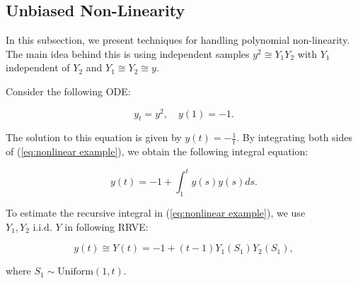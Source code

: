 \documentclass[a4paper,12pt]{article}
\begin{document}
\subsection{Unbiased Non-Linearity}

In this subsection, we present techniques for handling polynomial non-linearity.
The main idea behind this is using independent samples
$y^{2} \cong Y_{1} Y_{2}$ with $Y_{1}$ independent of $ Y_{2}$ and
$Y_{1} \cong Y_{2} \cong y$.


\begin{example}[$y_t=y^{2}$] \label{ex:nonlinear example}
  Consider the following ODE:

  \begin{equation} \label{eq:nonlinear example}
    y_t = y^2, \quad y(1) = -1.
  \end{equation}

  The solution to this equation is given by $y(t) = -\frac{1}{t}$.
  By integrating both sides of (\ref{eq:nonlinear example}),
  we obtain the following integral equation:

  \begin{equation}
    y(t) = -1 + \int_{1}^{t} y(s) y(s)ds.
  \end{equation}

  To estimate the recursive integral in (\ref{eq:nonlinear example}),
  we use  $Y_1,Y_2 \text{ i.i.d. } Y$ in following RRVE:

  \begin{equation} \label{RRVE: nonlinear example}
    y(t) \cong Y(t) = -1 + (t-1) Y_1(S_{1}) Y_2(S_{1}),
  \end{equation}

  where $S_{1} \sim \text{Uniform}(1,t)$.
\end{example}
\end{document}
